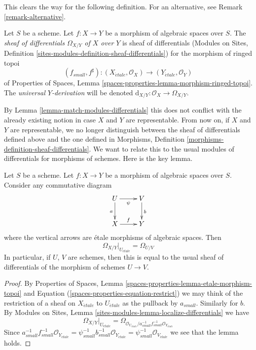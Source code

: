 \noindent
This clears the way for the following definition. For an alternative, see
Remark \ref{remark-alternative}.

\begin{definition}
\label{definition-sheaf-differentials}
Let $S$ be a scheme. Let $f : X \to Y$ be a morphism of algebraic spaces
over $S$. The {\it sheaf of differentials $\Omega_{X/Y}$ of $X$ over $Y$}
is sheaf of differentials
(Modules on Sites,
Definition \ref{sites-modules-definition-sheaf-differentials})
for the morphism of ringed topoi
$$
(f_{small}, f^\sharp) :
(X_{\acute{e}tale}, \mathcal{O}_X)
\to
(Y_{\acute{e}tale}, \mathcal{O}_Y)
$$
of
Properties of Spaces,
Lemma \ref{spaces-properties-lemma-morphism-ringed-topoi}.
The {\it universal $Y$-derivation} will be denoted
$\text{d}_{X/Y} : \mathcal{O}_X \to \Omega_{X/Y}$.
\end{definition}

\noindent
By
Lemma \ref{lemma-match-modules-differentials}
this does not conflict with the already existing
notion in case $X$ and $Y$ are representable. From now on, if $X$ and $Y$
are representable, we no longer distinguish between the sheaf of differentials
defined above and the one defined in
Morphisms, Definition \ref{morphisms-definition-sheaf-differentials}.
We want to relate this to the usual modules of differentials for
morphisms of schemes. Here is the key lemma.

\begin{lemma}
\label{lemma-localize-differentials}
Let $S$ be a scheme. Let $f : X \to Y$ be a morphism of algebraic spaces
over $S$. Consider any commutative diagram
$$
\xymatrix{
U \ar[d]_a \ar[r]_\psi & V \ar[d]^b \\
X \ar[r]^f & Y
}
$$
where the vertical arrows are \'etale morphisms of algebraic spaces. Then
$$
\Omega_{X/Y}|_{U_{\acute{e}tale}} = \Omega_{U/V}
$$
In particular, if $U$, $V$ are schemes, then this is equal to the usual
sheaf of differentials of the morphism of schemes $U \to V$.
\end{lemma}

\begin{proof}
By
Properties of Spaces, Lemma \ref{spaces-properties-lemma-etale-morphism-topoi}
and Equation (\ref{spaces-properties-equation-restrict})
we may think of the restriction of a sheaf on $X_{\acute{e}tale}$ to
$U_{\acute{e}tale}$ as the pullback by $a_{small}$. Similarly for $b$. By
Modules on Sites, Lemma \ref{sites-modules-lemma-localize-differentials}
we have
$$
\Omega_{X/Y}|_{U_{\acute{e}tale}} =
\Omega_{\mathcal{O}_{U_{\acute{e}tale}}/
a_{small}^{-1}f_{small}^{-1}\mathcal{O}_{Y_{\acute{e}tale}}}
$$
Since $a_{small}^{-1}f_{small}^{-1}\mathcal{O}_{Y_{\acute{e}tale}}
= \psi_{small}^{-1}b_{small}^{-1}\mathcal{O}_{Y_{\acute{e}tale}}
= \psi_{small}^{-1}\mathcal{O}_{V_{\acute{e}tale}}$ we see that the lemma holds.
\end{proof}

